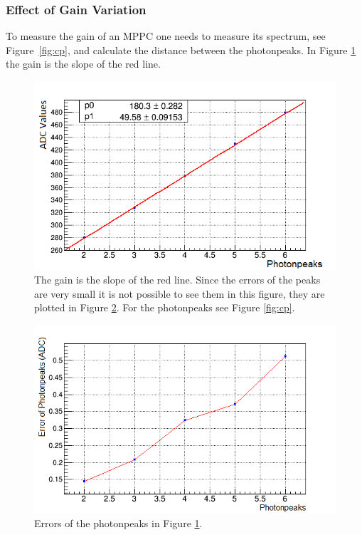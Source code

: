 \documentclass[a4paper]{article}\linespread{1.4}
\begin{document}
\subsubsection{Effect of Gain Variation}
\label{chap:gdf}
To measure the gain of an MPPC one needs to measure its spectrum, see Figure~\ref{fig:cp}, and calculate the distance between the photonpeaks.
In Figure \ref{fig:gain} the gain is the slope of the red line.%
\begin{figure}[] \hspace*{-1cm} \includegraphics[width=130mm,scale=2.0]{gain.png} \caption{The gain is the slope of the red line. Since the errors of the peaks are very small it is not possible to see them in this figure, they are plotted in Figure \ref{fig:gaine}. For the photonpeaks see Figure \ref{fig:cp}.} \label{fig:gain}\end{figure}
\begin{figure}[] \hspace*{-1cm} \includegraphics[width=130mm,scale=2.0]{gaine.png} \caption{Errors of the photonpeaks in Figure \ref{fig:gain}.} \label{fig:gaine}\end{figure}
\end{document}
